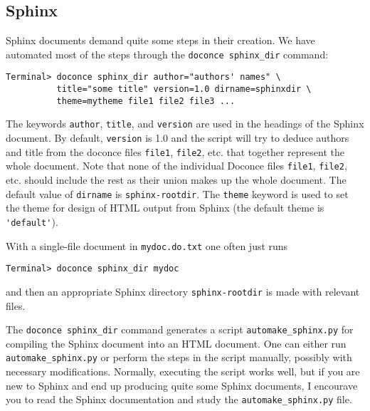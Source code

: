 \documentclass[%
oneside,                 %
final,                   %
10pt]{article}
\begin{document}
\noindent
\subsection{Sphinx}

Sphinx documents demand quite some steps in their creation. We have automated
most of the steps through the {\fontsize{10pt}{10pt}\Verb!doconce sphinx_dir!} command:
\vspace{4pt}
\begin{Verbatim}[numbers=none,frame=lines,fontsize=\fontsize{9pt}{9pt},labelposition=topline,framesep=2.5mm,framerule=0.7pt]
Terminal> doconce sphinx_dir author="authors' names" \ 
          title="some title" version=1.0 dirname=sphinxdir \ 
          theme=mytheme file1 file2 file3 ...
\end{Verbatim}
The keywords {\fontsize{10pt}{10pt}\Verb!author!}, {\fontsize{10pt}{10pt}\Verb!title!}, and {\fontsize{10pt}{10pt}\Verb!version!} are used in the headings
of the Sphinx document. By default, {\fontsize{10pt}{10pt}\Verb!version!} is 1.0 and the script
will try to deduce authors and title from the doconce files {\fontsize{10pt}{10pt}\Verb!file1!},
{\fontsize{10pt}{10pt}\Verb!file2!}, etc. that together represent the whole document. Note that
none of the individual Doconce files {\fontsize{10pt}{10pt}\Verb!file1!}, {\fontsize{10pt}{10pt}\Verb!file2!}, etc. should
include the rest as their union makes up the whole document.
The default value of {\fontsize{10pt}{10pt}\Verb!dirname!} is {\fontsize{10pt}{10pt}\Verb!sphinx-rootdir!}. The {\fontsize{10pt}{10pt}\Verb!theme!}
keyword is used to set the theme for design of HTML output from
Sphinx (the default theme is {\fontsize{10pt}{10pt}\Verb!'default'!}).

With a single-file document in {\fontsize{10pt}{10pt}\Verb!mydoc.do.txt!} one often just runs
\vspace{4pt}
\begin{Verbatim}[numbers=none,frame=lines,fontsize=\fontsize{9pt}{9pt},labelposition=topline,framesep=2.5mm,framerule=0.7pt]
Terminal> doconce sphinx_dir mydoc
\end{Verbatim}
and then an appropriate Sphinx directory {\fontsize{10pt}{10pt}\Verb!sphinx-rootdir!} is made with
relevant files.

The {\fontsize{10pt}{10pt}\Verb!doconce sphinx_dir!} command generates a script
{\fontsize{10pt}{10pt}\Verb!automake_sphinx.py!} for compiling the Sphinx document into an HTML
document.  One can either run {\fontsize{10pt}{10pt}\Verb!automake_sphinx.py!} or perform the
steps in the script manually, possibly with necessary modifications.
Normally, executing the script works well, but if you are new
to Sphinx and end up producing quite some Sphinx documents, I encourave
you to read the Sphinx documentation and study the {\fontsize{10pt}{10pt}\Verb!automake_sphinx.py!}
file.
\end{document}
